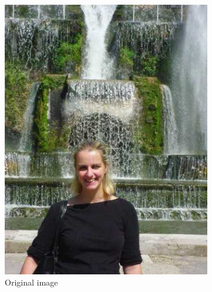\documentclass[11pt,oneside]{book}
\theoremstyle{plain}
\theoremstyle{definition}
\theoremstyle{remark}
\begin{document}
\begin{figure}[H]
  \centering
  \caption{Removing large objects from images (image obtained from \cite{Criminisi2004}).}
  \begin{subfigure}[b]{0.49\textwidth}
    \includegraphics[width=\textwidth]{researchmicros-000.jpg}
    \caption{Original image}
  \end{subfigure}
  \hfill
  \begin{subfigure}[b]{0.49\textwidth}

\end{subfigure}
\end{figure}
\end{document}
